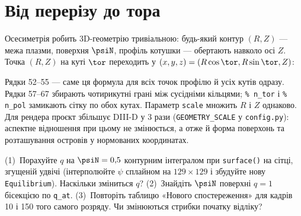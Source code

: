 \section{Від перерізу до тора}\label{sec:geo3-3d}

Осесиметрія робить 3D-геометрію тривіальною: будь-який контур $(R,Z)$ --- межа плазми, поверхня $\psiN$, профіль котушки --- обертають навколо осі $Z$. Точка $(R,Z)$ на куті $\tor$ переходить у $(x,y,z)=(R\cos\tor,R\sin\tor,Z)$:


\noindent Рядки 52--55 --- саме ця формула для всіх точок профілю й усіх кутів одразу. Рядки 57--67 збирають чотирикутні грані між сусідніми кільцями; \texttt{\% n\_tor} і \texttt{\% n\_pol} замикають сітку по обох кутах. Параметр \texttt{scale} множить $R$ і $Z$ однаково. Для рендера проєкт збільшує DIII-D у 3 рази (\texttt{GEOMETRY\_SCALE} у \texttt{config.py}): аспектне відношення при цьому не змінюється, а отже й форма поверхонь та розташування островів у нормованих координатах.

\begin{practicum}[$q$ і $\thetastar$]
(1)~Порахуйте $q$ на $\psiN=0{,}5$ контурним інтегралом при \texttt{surface()} на сітці, згущеній удвічі (інтерполюйте $\psi$ сплайном на $129\times129$ і збудуйте нову \texttt{Equilibrium}). Наскільки зміниться $q$? (2)~Знайдіть $\psiN$ поверхні $q=1$ бісекцією по \texttt{q\_at}. (3)~Повторіть таблицю «Нового спостереження» для кадрів 10 і 150 того самого розряду. Чи змінюються стрибки початку відліку?
\end{practicum}
